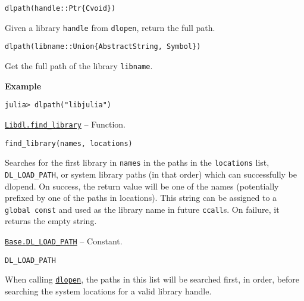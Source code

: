 \begin{adjustwidth}{2em}{0pt}


\begin{verbatim}
dlpath(handle::Ptr{Cvoid})
\end{verbatim}

Given a library \texttt{handle} from \texttt{dlopen}, return the full path.




\begin{lstlisting}
dlpath(libname::Union{AbstractString, Symbol})
\end{lstlisting}

Get the full path of the library \texttt{libname}.

\textbf{Example}


\begin{verbatim}
julia> dlpath("libjulia")
\end{verbatim}



\end{adjustwidth}
\hypertarget{12933484848758864058}{} 
\hyperlink{12933484848758864058}{\texttt{Libdl.find\_library}}  -- {Function.}

\begin{adjustwidth}{2em}{0pt}


\begin{verbatim}
find_library(names, locations)
\end{verbatim}

Searches for the first library in \texttt{names} in the paths in the \texttt{locations} list, \texttt{DL\_LOAD\_PATH}, or system library paths (in that order) which can successfully be dlopen{\textquotesingle}d. On success, the return value will be one of the names (potentially prefixed by one of the paths in locations). This string can be assigned to a \texttt{global const} and used as the library name in future \texttt{ccall}{\textquotesingle}s. On failure, it returns the empty string.



\end{adjustwidth}
\hypertarget{617000259211246203}{} 
\hyperlink{617000259211246203}{\texttt{Base.DL\_LOAD\_PATH}}  -- {Constant.}

\begin{adjustwidth}{2em}{0pt}


\begin{verbatim}
DL_LOAD_PATH
\end{verbatim}

When calling \hyperlink{8171750449393676854}{\texttt{dlopen}}, the paths in this list will be searched first, in order, before searching the system locations for a valid library handle.



\end{adjustwidth}

